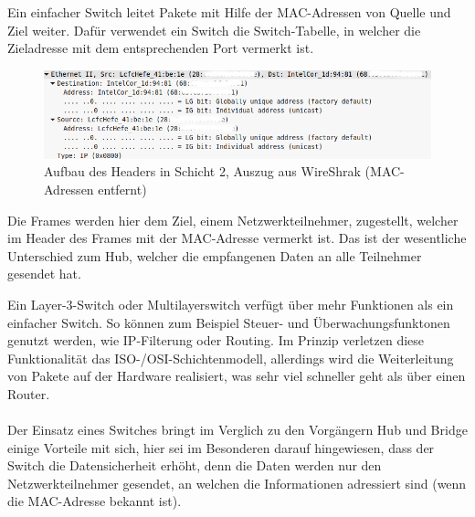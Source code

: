 Ein einfacher Switch leitet Pakete mit Hilfe der MAC-Adressen von Quelle und Ziel weiter. Dafür verwendet ein Switch die Switch-Tabelle, in welcher die Zieladresse mit dem entsprechenden Port vermerkt ist.
\begin{figure}[H]
	\centering
	\includegraphics[width=1\linewidth]{images/wireshark-EthernettII.png}
	\caption{Aufbau des Headers in Schicht 2, Auszug aus WireShrak (MAC-Adressen entfernt)}
\end{figure}
Die Frames werden hier dem Ziel, einem Netzwerkteilnehmer, zugestellt, welcher im Header des Frames mit der MAC-Adresse vermerkt ist. Das ist der wesentliche Unterschied zum Hub, welcher die empfangenen Daten an alle Teilnehmer gesendet hat.

Ein Layer-3-Switch oder Multilayerswitch verfügt über mehr Funktionen als ein einfacher Switch. So können zum Beispiel Steuer- und Überwachungsfunktonen genutzt werden, wie IP-Filterung oder Routing. Im Prinzip verletzen diese Funktionalität das ISO-/OSI-Schichtenmodell, allerdings wird die Weiterleitung von Pakete auf der Hardware realisiert, was sehr viel schneller geht als über einen Router.
\\ \\
Der Einsatz eines Switches bringt im Verglich zu den Vorgängern Hub und Bridge einige Vorteile mit sich, hier sei im Besonderen darauf hingewiesen, dass der Switch die Datensicherheit erhöht, denn die Daten werden nur den Netzwerkteilnehmer gesendet, an welchen die Informationen adressiert sind (wenn die MAC-Adresse bekannt ist).

